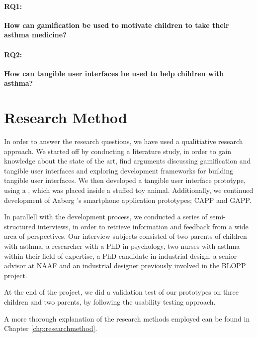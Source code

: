 \paragraph{RQ1:}
\textbf{How can gamification be used to motivate children to take their asthma medicine?}


\paragraph{RQ2:}
\textbf{How can tangible user interfaces be used to help children with asthma?}


\section{Research Method}
\label{sec:researchmethod}
In order to answer the research questions, we have used a qualitiative research approach. 
We started off by conducting a literature study, in order to gain knowledge about the state of the art, find arguments discussing gamification and tangible user interfaces and exploring development frameworks for building tangible user interfaces. We then developed a tangible user interface prototype, using a \rpi{}, which was placed inside a stuffed toy animal. Additionally, we continued development of Aaberg \etal{}'s smartphone application prototypes; CAPP and GAPP. 

In parallell with the development process, we conducted a series of semi-structured interviews, in order to retrieve information and feedback from a wide area of perspectives. Our interview subjects consisted of two parents of children with asthma, a researcher with a PhD in psychology, two nurses with asthma within their field of expertise, a PhD candidate in industrial design, a senior advisor at NAAF and an industrial designer previously involved in the BLOPP project. 

At the end of the project, we did a validation test of our prototypes on three children and two parents, by following the usability testing approach. 

A more thorough explanation of the research methods employed can be found in Chapter \ref{chp:researchmethod}. 

